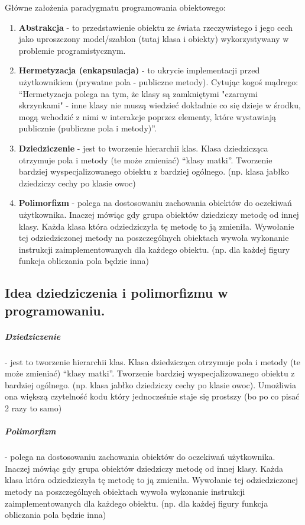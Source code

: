\documentclass[a4paper,12pt,oneside]{book}
\begin{document}
				Główne założenia paradygmatu programowania obiektowego:
				\begin{enumerate}
					\item \textbf{Abstrakcja} - to przedstawienie obiektu ze świata rzeczywistego i jego cech jako
					uproszczony model/szablon (tutaj klasa i obiekty) wykorzystywany w problemie
					programistycznym.
					\item \textbf{Hermetyzacja (enkapsulacja)} - to ukrycie implementacji przed użytkownikiem
					(prywatne pola - publiczne metody).
					Cytując kogoś mądrego: “Hermetyzacja polega na tym, że klasy są zamkniętymi
					"czarnymi skrzynkami" - inne klasy nie muszą wiedzieć dokładnie co się dzieje w
					środku, mogą wchodzić z nimi w interakcje poprzez elementy, które wystawiają
					publicznie (publiczne pola i metody)”.
					\item \textbf{Dziedziczenie} - jest to tworzenie hierarchii klas. Klasa dziedzicząca otrzymuje pola i
					metody (te może zmieniać) “klasy matki”. Tworzenie bardziej wyspecjalizowanego
					obiektu z bardziej ogólnego. (np. klasa jabłko dziedziczy cechy po klasie owoc)
					\item \textbf{Polimorfizm} - polega na dostosowaniu zachowania obiektów do oczekiwań
					użytkownika. Inaczej mówiąc gdy grupa obiektów dziedziczy metodę od innej klasy.
					Każda klasa która odziedziczyła tę metodę to ją zmieniła. Wywołanie tej
					odziedziczonej metody na poszczególnych obiektach wywoła wykonanie instrukcji
					zaimplementowanych dla każdego obiektu. (np. dla każdej figury funkcja obliczania
					pola będzie inna)
				\end{enumerate}
			\newpage\subsection{Idea dziedziczenia i polimorfizmu w programowaniu.}
				\subparagraph{Dziedziczenie} - jest to tworzenie hierarchii klas. Klasa dziedzicząca otrzymuje pola i metody
				(te może zmieniać) “klasy matki”. Tworzenie bardziej wyspecjalizowanego obiektu z bardziej
				ogólnego. (np. klasa jabłko dziedziczy cechy po klasie owoc).
				Umożliwia ona większą czytelność kodu który jednocześnie staje się prostszy (bo po co
				pisać 2 razy to samo)
				
				\subparagraph{Polimorfizm} - polega na dostosowaniu zachowania obiektów do oczekiwań użytkownika.
				Inaczej mówiąc gdy grupa obiektów dziedziczy metodę od innej klasy. Każda klasa która
				odziedziczyła tę metodę to ją zmieniła. Wywołanie tej odziedziczonej metody na
				poszczególnych obiektach wywoła wykonanie instrukcji zaimplementowanych dla każdego
				obiektu. (np. dla każdej figury funkcja obliczania pola będzie inna)
				
\end{document}
